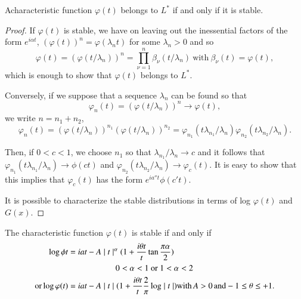   \begin{theorem}[P.L\'evy]\label{chap2:sec11:thm42} %
    A\pageoriginale characteristic function
    $\varphi (t)$ belongs to $L^*$ if and only if it is stable. 
  \end{theorem}

  \begin{proof}
    If $\varphi (t)$ is stable, we have on leaving out the inessential
    factors of the form $e^{i\alpha t}$, $(\varphi(t))^n = \varphi
    (\lambda_{n}t)$ for some $\lambda_{n}>0$ and so 
    $$
    \varphi(t)=(\varphi(t/\lambda_{n}))^n =
    \prod\limits^{n}_{\nu=1} \beta_{\nu}(t/\lambda_{n})~
    \text{with} ~\beta_{\nu}(t) = \varphi(t),
    $$
which is enough to show that $\varphi (t)$ belongs to $L^*$. 

Conversely, if we suppose that a sequence $\lambda_{n}$ can be found so that
   $$
   \varphi_{n}(t)= (\varphi(t/\lambda_{n}))^n \rightarrow \varphi(t),
   $$
we write $n = n_1 + n_2$,
   $$
\varphi_n(t) = (\varphi (t/\lambda_n))^{n_{1}}
(\varphi(t/\lambda_{n}))^{n_{2}} = \varphi_{n_{1}} (t
\lambda_{n_{1}}/\lambda_n)\varphi_{n_{2}} (t
\lambda_{n_{2}}/\lambda_n).
   $$

 Then, if   $0 < c < 1$, we choose $n_1$ so that
 $\lambda_{n_{1}}/\lambda_n \rightarrow c$ and it follows that
 $\varphi_{n_{1}}(t \lambda_{n_1}/\lambda_n) 
 \rightarrow \phi(ct)$  and  $\varphi_{n_{2}}(t \lambda_{n_2}/\lambda_n)
 \rightarrow\varphi_c (t)$. It is easy to show that this implies that
 $\varphi_c(t)$ has the form $e^{ia''t}\phi (c' t)$. 

It is possible to characterize the stable distributions in terms of
log $\varphi (t)$ and $G(x)$. 
  \end{proof}

\begin{theorem}[P.L\'evy]\label{chap2:sec11:thm43}
  The characteristic function $\varphi (t)$ is stable if and only if
  \begin{align*}
    \log \phi t & = iat - A \mid t \mid^{\alpha}  (1+\frac{i \theta
      t}{t} \tan \frac{\pi\alpha}{2})\\ 
    & \hspace{2cm}0 < \alpha < 1 ~\text{or}~ 1 < \alpha < 2\\
         {\rm or} \log \varphi(t) & = iat - A \mid t \mid (1 + \frac{i\theta
           t}{t} \frac{2}{\pi} \log \mid t \mid) {\rm with}\, A > 0
         \,{\rm and} -1 \leq \theta \leq + 1. 
  \end{align*}
\end{theorem}\pageoriginale

